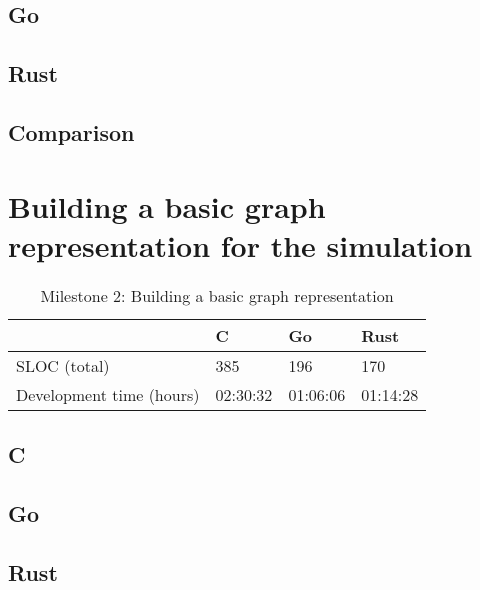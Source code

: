 \subsection{Go}
\label{subsec:Implementation::Counting::Go}


\subsection{Rust}
\label{subsec:Implementation::Counting::Rust}


\subsection{Comparison}
\label{subsec:Implementation::Counting::Comparison}

\section{Building a basic graph representation for the simulation}
\label{sec:Implementation::Graph_Representation}

\begin{table}[htb]
    \centering
    \begin{tabular}{llll}
        \toprule
            & C
            & Go
            & Rust \\
        \midrule

        SLOC (total)
            & 385
            & 196
            & 170 \\

        Development time (hours)
            & 02:30:32
            & 01:06:06
            & 01:14:28 \\
        \bottomrule
    \end{tabular}
    \caption{Milestone 2: Building a basic graph representation}
    \label{tb:milestone2}
\end{table}

\subsection{C}
\label{subsec:Implementation::Graph_Representation::C}


\subsection{Go}
\label{subsec:Implementation::Graph_Representation::Go}


\subsection{Rust}
\label{subsec:Implementation::Graph_Representation::Rust}


